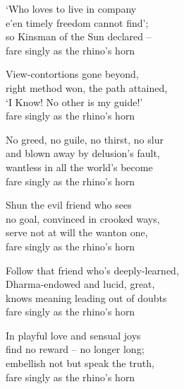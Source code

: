 \begin{MyDescription}{}  	
`Who loves to live in company\\
e'en timely freedom cannot find';\\
so Kinsman of the Sun declared – \\
fare singly as the rhino's horn
\end{MyDescription}
   
\begin{MyDescription}{}  	
View-contortions gone beyond,\\
right method won, the path attained,\\
`I Know! No other is my guide!'\\
fare singly as the rhino's horn
\end{MyDescription}
   
\begin{MyDescription}{}  	
No greed, no guile, no thirst, no slur\\
and blown away by delusion's fault,\\
wantless in all the world's become\\
fare singly as the rhino's horn
\end{MyDescription}
   
\begin{MyDescription}{}  	
Shun the evil friend who sees\\
no goal, convinced in crooked ways,\\
serve not at will the wanton one,\\
fare singly as the rhino's horn
\end{MyDescription}
   
\begin{MyDescription}{}  	
Follow that friend who's deeply-learned,\\
Dharma-endowed and lucid, great,\\
knows meaning leading out of doubts\\
fare singly as the rhino's horn
\end{MyDescription}
   
\begin{MyDescription}{}  	
In playful love and sensual joys\\
find no reward – no longer long;\\
embellish not but speak the truth,\\
fare singly as the rhino's horn
\end{MyDescription}
   
